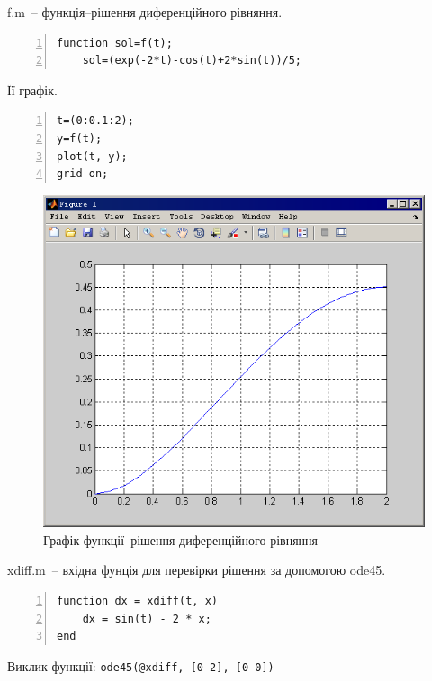 \documentclass[a4paper, 10pt]{article}
\begin{document}
\begin{enumerate}
{	\noindent
	f.m~-- функція--рішення диференційного рівняння.
	\begin{lstlisting}[numbers=left]
function sol=f(t);
    sol=(exp(-2*t)-cos(t)+2*sin(t))/5;
	\end{lstlisting}
	Її графік.
	\begin{lstlisting}[numbers=left]
t=(0:0.1:2);
y=f(t);
plot(t, y);
grid on;
	\end{lstlisting}

	\begin{figure}[H]
	\begin{center}
	\includegraphics{1_sin_check.png}
	\caption{Графік функції--рішення диференційного рівняння}
	\end{center}
	\end{figure}

	\noindent
	xdiff.m~-- вхідна фунція для перевірки рішення за допомогою ode45.
	\begin{lstlisting}[numbers=left]
function dx = xdiff(t, x)
    dx = sin(t) - 2 * x;
end
	\end{lstlisting}

	Виклик функції: \texttt{ode45(@xdiff, [0 2], [0 0])}

}
\end{enumerate}
\end{document}
